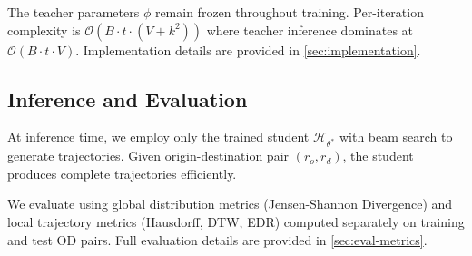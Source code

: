 The teacher parameters $\phi$ remain frozen throughout training. Per-iteration complexity is $\mathcal{O}(B \cdot t \cdot (V + k^2))$ where teacher inference dominates at $\mathcal{O}(B \cdot t \cdot V)$. Implementation details are provided in \autoref{sec:implementation}.

\subsection{Inference and Evaluation}
\label{sec:method-inference}

At inference time, we employ only the trained student $\mathcal{H}_{\theta^*}$ with beam search to generate trajectories. Given origin-destination pair $(r_o, r_d)$, the student produces complete trajectories efficiently.

We evaluate using global distribution metrics (Jensen-Shannon Divergence) and local trajectory metrics (Hausdorff, DTW, EDR) computed separately on training and test OD pairs. Full evaluation details are provided in \autoref{sec:eval-metrics}.